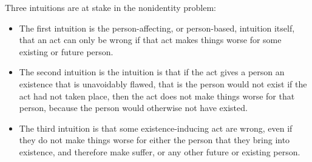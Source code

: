 Three intuitions are at stake in the nonidentity problem:
\begin{itemize}
	\item The first intuition is the person-affecting, or person-based, intuition itself, that an act can only be wrong if that act makes things worse for some existing or future person.
	\item The second intuition is the intuition is that if the act gives a person an existence that is unavoidably flawed, that is the person would not exist if the act had not taken place, then the act does not make things worse for that person, because the person would otherwise not have existed.
	\item The third intuition is that some existence-inducing act are wrong, even if they do not make things worse for either the person that they bring into existence, and therefore make suffer, or any other future or existing person.
\end{itemize}


